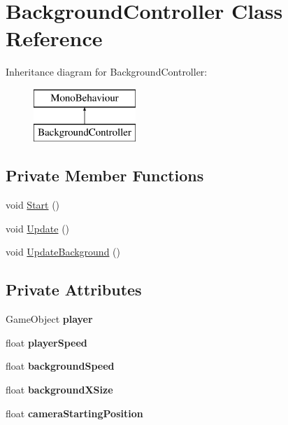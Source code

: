 \hypertarget{class_background_controller}{}\section{Background\+Controller Class Reference}
\label{class_background_controller}
Inheritance diagram for Background\+Controller\+:\begin{figure}[H]
\begin{center}
\leavevmode
\includegraphics[height=2.000000cm]{class_background_controller}
\end{center}
\end{figure}
\subsection*{Private Member Functions}
\begin{DoxyCompactItemize}
\item 
void \mbox{\hyperlink{class_background_controller_ae65426d342e98cb14dab526c8bd5eadf}{Start}} ()
\item 
void \mbox{\hyperlink{class_background_controller_a8b0308f1657005894bfcc4abb4cf0dcc}{Update}} ()
\item 
void \mbox{\hyperlink{class_background_controller_aed6fe8cd55d54cee3db479e5106738af}{Update\+Background}} ()
\end{DoxyCompactItemize}
\subsection*{Private Attributes}
\begin{DoxyCompactItemize}
\item 
\mbox{\label{class_background_controller_acf0ab5cdaeb053323902f4df157ed388}} 
Game\+Object {\bfseries player}
\item 
\mbox{\label{class_background_controller_a87e9a5e866ae564b9998481853fcc687}} 
float {\bfseries player\+Speed}
\item 
\mbox{\label{class_background_controller_a487173be6eb5aa213f9b7e8ff6de425a}} 
float {\bfseries background\+Speed}
\item 
\mbox{\label{class_background_controller_a16561d62baa5844e044391343cb05c15}} 
float {\bfseries background\+X\+Size}
\item 
\mbox{\label{class_background_controller_a760c64715763b28d7c25cef7740f4917}} 
float {\bfseries camera\+Starting\+Position}
\end{DoxyCompactItemize}


